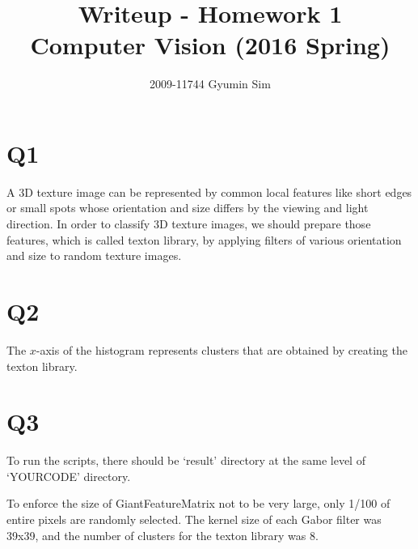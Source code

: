 \documentclass[a4paper,10pt]{article}
\begin{document}
\title{Writeup - Homework 1 \\
  \large Computer Vision (2016 Spring)}
\author{2009-11744 Gyumin Sim}
\maketitle

\section*{Q1}

A 3D texture image can be represented by common local features like short edges or small spots whose orientation and size differs by the viewing and light direction.
In order to classify 3D texture images, we should prepare those features, which is called texton library, by applying filters of various orientation and size to random texture images.

\section*{Q2}

The $x$-axis of the histogram represents clusters that are obtained by creating the texton library.

\section*{Q3}

To run the scripts, there should be `result' directory at the same level of `YOURCODE' directory.

To enforce the size of GiantFeatureMatrix not to be very large, only 1/100 of entire pixels are randomly selected.
The kernel size of each Gabor filter was 39x39, and the number of clusters for the texton library was 8.
\end{document}
